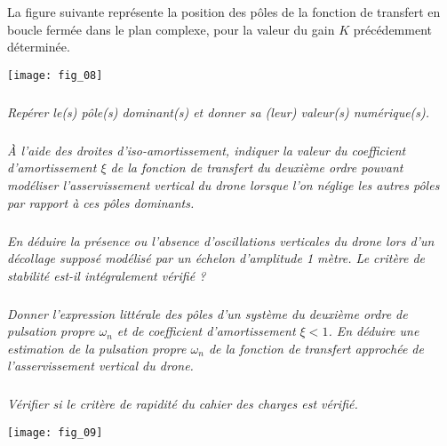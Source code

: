 \begin{multicols}{2}
La figure suivante représente la position des pôles de la fonction de transfert en boucle fermée dans le plan
complexe, pour la valeur du gain $K$ précédemment déterminée.


\begin{center}
\texttt{[image: fig\_08]}
\end{center}


\subparagraph{}\textit{Repérer le(s) pôle(s) dominant(s) et donner sa (leur) valeur(s) numérique(s).}
\ifprof
\begin{corrige}
\end{corrige}
\else
\fi
\subparagraph{}\textit{À l’aide des droites d’iso-amortissement, indiquer la valeur du coefficient d’amortissement $\xi$ de la
fonction de transfert du deuxième ordre pouvant modéliser l’asservissement vertical du drone lorsque
l’on néglige les autres pôles par rapport à ces pôles dominants.}
\ifprof
\begin{corrige}
\end{corrige}
\else
\fi
\subparagraph{}\textit{En déduire la présence ou l’absence d’oscillations verticales du drone lors d’un décollage supposé
modélisé par un échelon d’amplitude 1 mètre. Le critère de stabilité est-il intégralement vérifié ?}
\ifprof
\begin{corrige}
\end{corrige}
\else
\fi
\subparagraph{}\textit{Donner l’expression littérale des pôles d’un système du deuxième ordre de pulsation propre $\omega_n$ et de coefficient d’amortissement $\xi<1$. En déduire une estimation de la pulsation propre $\omega_n$ de la
fonction de transfert approchée de l’asservissement vertical du drone.}
\ifprof
\begin{corrige}
\end{corrige}
\else
\fi
\subparagraph{}\textit{Vérifier si le critère de rapidité du cahier des charges est vérifié.}
\ifprof
\begin{corrige}
\end{corrige}
\else
\fi
\begin{center}
\texttt{[image: fig\_09]}
\end{center}






\end{multicols}

